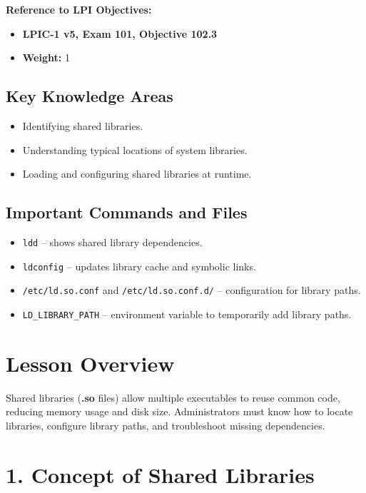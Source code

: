 \documentclass[12pt,a4paper]{report}
\begin{document}
\textbf{Reference to LPI Objectives:}  
\begin{itemize}
    \item \textbf{LPIC-1 v5, Exam 101, Objective 102.3}  
    \item \textbf{Weight:} 1  
\end{itemize}

\subsection*{Key Knowledge Areas}
\begin{itemize}
    \item Identifying shared libraries.  
    \item Understanding typical locations of system libraries.  
    \item Loading and configuring shared libraries at runtime.
\end{itemize}

\subsection*{Important Commands and Files}
\begin{itemize}
    \item \texttt{ldd} – shows shared library dependencies.  
    \item \texttt{ldconfig} – updates library cache and symbolic links.  
    \item \texttt{/etc/ld.so.conf} and \texttt{/etc/ld.so.conf.d/} – configuration for library paths.  
    \item \texttt{LD\_LIBRARY\_PATH} – environment variable to temporarily add library paths.
\end{itemize}

 

\section*{Lesson Overview}

Shared libraries (\textbf{.so} files) allow multiple executables to reuse common code, reducing memory usage and disk size. Administrators must know how to locate libraries, configure library paths, and troubleshoot missing dependencies.

 

\section*{1. Concept of Shared Libraries}
\end{document}
